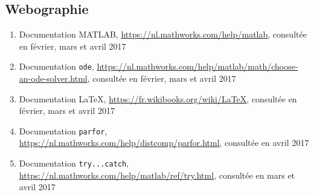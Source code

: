 \documentclass[a4paper, 12pt]{article}
\begin{document}
	\subsection{Webographie}
	\begin{enumerate}
		\item Documentation \textsc{MATLAB}, {\url{https://nl.mathworks.com/help/matlab}}, consultée en février, mars et avril 2017
		\item Documentation \texttt{ode}, {\url{https://nl.mathworks.com/help/matlab/math/choose-an-ode-solver.html}}, consultée en février, mars et avril 2017
		\item Documentation \LaTeX, {\url{https://fr.wikibooks.org/wiki/LaTeX}}, consultée en février, mars et avril 2017
		\item Documentation \texttt{parfor}, {\url{https://nl.mathworks.com/help/distcomp/parfor.html}}, consultée en avril 2017
		\item Documentation \texttt{try...catch}, {\url{https://nl.mathworks.com/help/matlab/ref/try.html}}, consultée en mars et avril 2017
	\end{enumerate}
\end{document}
